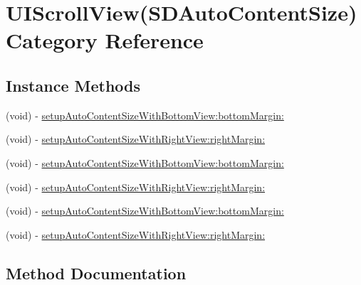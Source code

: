 \hypertarget{category_u_i_scroll_view_07_s_d_auto_content_size_08}{}\section{U\+I\+Scroll\+View(S\+D\+Auto\+Content\+Size) Category Reference}
\label{category_u_i_scroll_view_07_s_d_auto_content_size_08}
\subsection*{Instance Methods}
\begin{DoxyCompactItemize}
\item 
(void) -\/ \mbox{\hyperlink{category_u_i_scroll_view_07_s_d_auto_content_size_08_ad9f1f0deef329852dfba456b6ef86003}{setup\+Auto\+Content\+Size\+With\+Bottom\+View\+:bottom\+Margin\+:}}
\item 
(void) -\/ \mbox{\hyperlink{category_u_i_scroll_view_07_s_d_auto_content_size_08_aa406237a7ba0260904d7c9008635bbe7}{setup\+Auto\+Content\+Size\+With\+Right\+View\+:right\+Margin\+:}}
\item 
(void) -\/ \mbox{\hyperlink{category_u_i_scroll_view_07_s_d_auto_content_size_08_ad9f1f0deef329852dfba456b6ef86003}{setup\+Auto\+Content\+Size\+With\+Bottom\+View\+:bottom\+Margin\+:}}
\item 
(void) -\/ \mbox{\hyperlink{category_u_i_scroll_view_07_s_d_auto_content_size_08_aa406237a7ba0260904d7c9008635bbe7}{setup\+Auto\+Content\+Size\+With\+Right\+View\+:right\+Margin\+:}}
\item 
(void) -\/ \mbox{\hyperlink{category_u_i_scroll_view_07_s_d_auto_content_size_08_ad9f1f0deef329852dfba456b6ef86003}{setup\+Auto\+Content\+Size\+With\+Bottom\+View\+:bottom\+Margin\+:}}
\item 
(void) -\/ \mbox{\hyperlink{category_u_i_scroll_view_07_s_d_auto_content_size_08_aa406237a7ba0260904d7c9008635bbe7}{setup\+Auto\+Content\+Size\+With\+Right\+View\+:right\+Margin\+:}}
\end{DoxyCompactItemize}


\subsection{Method Documentation}
\mbox{\label{category_u_i_scroll_view_07_s_d_auto_content_size_08_ad9f1f0deef329852dfba456b6ef86003}} 
